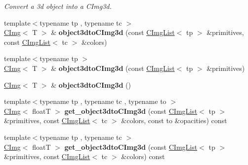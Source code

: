 \begin{DoxyCompactItemize}
\begin{DoxyCompactList}\small\item\em Convert a 3d object into a CImg3d. \item\end{DoxyCompactList}\item 
\hypertarget{structcimg__library_1_1CImg_af24b1e4238a56770545962924c74071f}{
{\footnotesize template$<$typename tp , typename tc $>$ }\\\hyperlink{structcimg__library_1_1CImg}{CImg}$<$ T $>$ \& {\bfseries object3dtoCImg3d} (const \hyperlink{structcimg__library_1_1CImgList}{CImgList}$<$ tp $>$ \&primitives, const \hyperlink{structcimg__library_1_1CImgList}{CImgList}$<$ tc $>$ \&colors)}
\label{structcimg__library_1_1CImg_af24b1e4238a56770545962924c74071f}

\item 
\hypertarget{structcimg__library_1_1CImg_a09f598394c3489c529c2f46aabbb187d}{
{\footnotesize template$<$typename tp $>$ }\\\hyperlink{structcimg__library_1_1CImg}{CImg}$<$ T $>$ \& {\bfseries object3dtoCImg3d} (const \hyperlink{structcimg__library_1_1CImgList}{CImgList}$<$ tp $>$ \&primitives)}
\label{structcimg__library_1_1CImg_a09f598394c3489c529c2f46aabbb187d}

\item 
\hypertarget{structcimg__library_1_1CImg_aaa342469ac972ad7ee0cd4071986ca50}{
\hyperlink{structcimg__library_1_1CImg}{CImg}$<$ T $>$ \& {\bfseries object3dtoCImg3d} ()}
\label{structcimg__library_1_1CImg_aaa342469ac972ad7ee0cd4071986ca50}

\item 
\hypertarget{structcimg__library_1_1CImg_a835d1928d0b4d54e2d0fc8d4ee03d110}{
{\footnotesize template$<$typename tp , typename tc , typename to $>$ }\\\hyperlink{structcimg__library_1_1CImg}{CImg}$<$ floatT $>$ {\bfseries get\_\-object3dtoCImg3d} (const \hyperlink{structcimg__library_1_1CImgList}{CImgList}$<$ tp $>$ \&primitives, const \hyperlink{structcimg__library_1_1CImgList}{CImgList}$<$ tc $>$ \&colors, const to \&opacities) const }
\label{structcimg__library_1_1CImg_a835d1928d0b4d54e2d0fc8d4ee03d110}

\item 
\hypertarget{structcimg__library_1_1CImg_a1e8a447222c67bc3dec6ac396b628923}{
{\footnotesize template$<$typename tp , typename tc $>$ }\\\hyperlink{structcimg__library_1_1CImg}{CImg}$<$ floatT $>$ {\bfseries get\_\-object3dtoCImg3d} (const \hyperlink{structcimg__library_1_1CImgList}{CImgList}$<$ tp $>$ \&primitives, const \hyperlink{structcimg__library_1_1CImgList}{CImgList}$<$ tc $>$ \&colors) const }
\label{structcimg__library_1_1CImg_a1e8a447222c67bc3dec6ac396b628923}


\end{DoxyCompactItemize}
